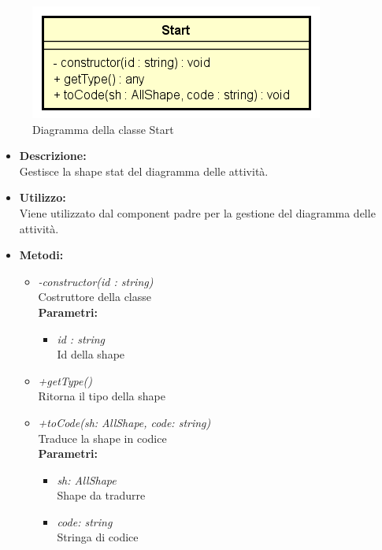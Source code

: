 \begin{figure}[h!]
	\centering
	\includegraphics[scale=0.8]{res/sections/SpecificaFrontEnd/Services/Disegnetti/start.png}
	\caption{Diagramma della classe Start}
\end{figure}

\begin{itemize}
	\item \textbf{Descrizione:}\\
	Gestisce la shape stat del diagramma delle attività.
	\item \textbf{Utilizzo:}\\
	Viene utilizzato dal component padre per la gestione del diagramma delle attività.
	\item \textbf{Metodi:}
		\begin{itemize}
			\item \emph{-constructor(id : string)}\\
    		Costruttore della classe\\
    		\textbf{Parametri:}
    		\begin{itemize}
    			\item \emph{id : string}\\
    			Id della shape
    		\end{itemize}
    		\item \emph{+getType()}\\
    		Ritorna il tipo della shape
    		\item \emph{+toCode(sh: AllShape, code: string)}\\
    		Traduce la shape in codice\\
    		\textbf{Parametri:}
    		\begin{itemize}
    			\item \emph{sh: AllShape}\\
    			Shape da tradurre
    			\item \emph{code: string}\\
    			Stringa di codice
    		\end{itemize}
    	\end{itemize}
\end{itemize}